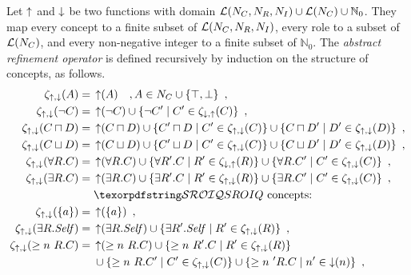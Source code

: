 \begin{definition}
  Let $\operatorname{\uparrow}$ and $\operatorname{\downarrow}$ be two functions with domain $\mathcal{L}(N_C, N_R, N_I) \cup \mathcal{L}(N_C) \cup \mathbb{N}_0$. They map every concept to a finite subset of $\mathcal{L}(N_C, N_R, N_I)$, every role to a subset of $\mathcal{L}(N_C)$, and every non-negative integer to a finite subset of $\mathbb{N}_0$.
  The \emph{abstract refinement operator} is defined recursively by induction on the structure of concepts, as follows.
  \begin{align*}
    \zeta_{\refine,\corefine}(A) ={} & \refine(A) \quad, A \in N_C \cup \{\top, \bot\} \enspace, \\
    \zeta_{\refine,\corefine}(\lnot C) ={} & \refine(\lnot C) \cup \{ \lnot C' \mid C' \in \zeta_{\corefine,\refine}(C) \} \enspace, \\
    \zeta_{\refine,\corefine}(C \sqcap D) ={} & \refine(C \sqcap D) \cup \{ C' \sqcap D \mid C' \in \zeta_{\refine,\corefine}(C) \}
    \cup \{ C \sqcap D' \mid D' \in \zeta_{\refine,\corefine}(D) \} \enspace, \\
    \zeta_{\refine,\corefine}(C \sqcup D) ={} & \refine(C \sqcup D) \cup \{ C' \sqcup D \mid C' \in \zeta_{\refine,\corefine}(C) \}
    \cup \{ C \sqcup D' \mid D' \in \zeta_{\refine,\corefine}(D) \} \enspace, \\
    \zeta_{\refine,\corefine}(\forall R.C) ={} & \refine(\forall R.C) \cup \{ \forall R'.C \mid R' \in \zeta_{\corefine,\refine}(R) \}
    \cup \{ \forall R.C' \mid C' \in \zeta_{\refine,\corefine}(C) \} \enspace, \\
    \zeta_{\refine,\corefine}(\exists R.C) ={} & \refine(\exists R.C) \cup \{ \exists R'.C \mid R' \in \zeta_{\refine,\corefine}(R) \}
    \cup \{ \exists R.C' \mid C' \in \zeta_{\refine,\corefine}(C) \} \enspace, \\
    & \text{\SROIQ concepts:} \\
    \zeta_{\refine,\corefine}(\nominal a) ={} & \refine(\nominal a) \enspace, \\
    \zeta_{\refine,\corefine}(\exists R.\self) ={} & \refine(\exists R.\self) \cup \{ \exists R'.\self \mid R' \in \zeta_{\refine,\corefine}(R) \} \enspace, \\
    \zeta_{\refine,\corefine}(\more n R.C) ={} & \refine(\more n R.C) \cup \{ \more n R'.C \mid R' \in \zeta_{\refine,\corefine}(R) \} \\
    & \cup \{ \more n R.C' \mid C' \in \zeta_{\refine,\corefine}(C) \}
    \cup \{ \more n' R.C \mid n' \in \corefine(n) \} \enspace, \\

\end{align*}
\end{definition}

